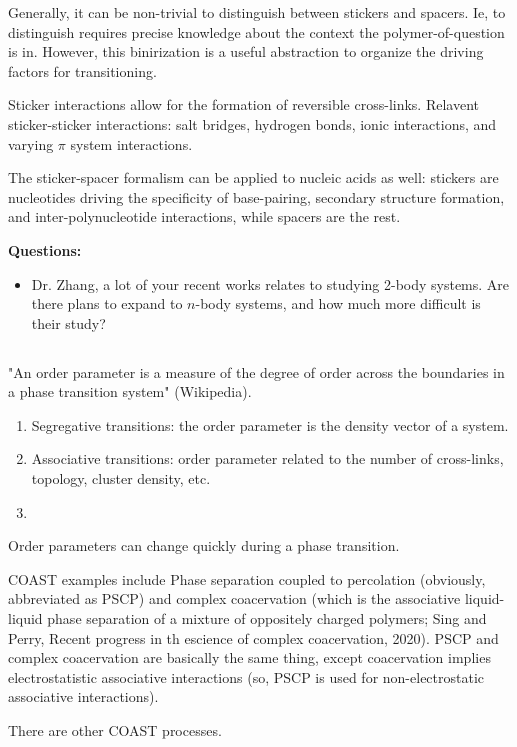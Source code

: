 \documentclass{article}
\begin{document}
Generally, it can be non-trivial to distinguish between stickers and spacers. Ie, to distinguish requires precise knowledge about the context the polymer-of-question is in. However, this binirization is a useful abstraction to organize the driving factors for transitioning.

Sticker interactions allow for the formation of reversible cross-links. Relavent sticker-sticker interactions: salt bridges, hydrogen bonds, ionic interactions, and varying $\pi$ system interactions.

The sticker-spacer formalism can be applied to nucleic acids as well: stickers are nucleotides driving the specificity of base-pairing, secondary structure formation, and inter-polynucleotide interactions, while spacers are the rest.

\textbf{Questions:}

\begin{itemize}
    \item Dr. Zhang, a lot of your recent works relates to studying 2-body systems. Are there plans to expand to $n$-body systems, and how much more difficult is their study?
\end{itemize}

\subsection{}

"An order parameter is a measure of the degree of order across the boundaries in a phase transition system" (Wikipedia).

\begin{enumerate}
    \item Segregative transitions: the order parameter is the density vector of a system.
    \item Associative transitions: order parameter related to the number of cross-links, topology, cluster density, etc.
    \item 
\end{enumerate}

Order parameters can change quickly during a phase transition.

COAST examples include Phase separation coupled to percolation (obviously, abbreviated as PSCP) and complex coacervation (which is the associative liquid-liquid phase separation of a mixture of oppositely charged polymers; Sing and Perry, Recent progress in th escience of complex coacervation, 2020). PSCP and complex coacervation are basically the same thing, except coacervation implies electrostatistic associative interactions (so, PSCP is used for non-electrostatic associative interactions).

There are other COAST processes.
\end{document}
